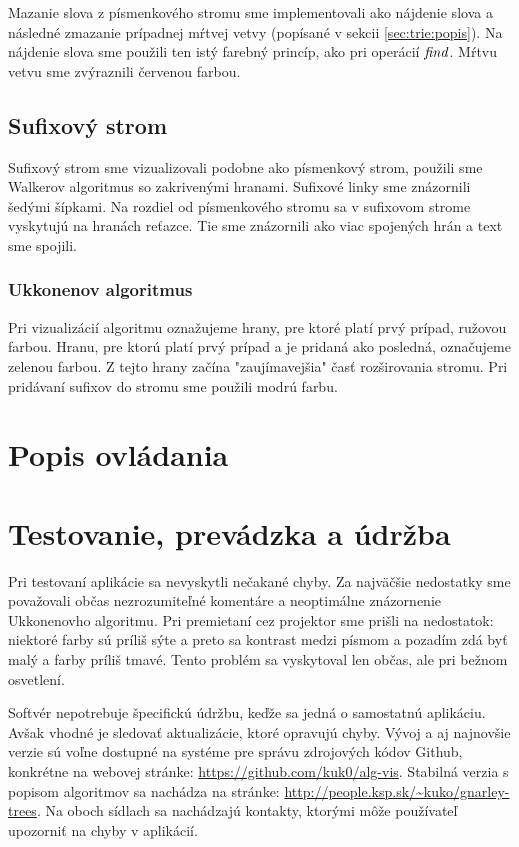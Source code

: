 Mazanie slova z písmenkového stromu sme implementovali ako nájdenie slova a 
následné zmazanie prípadnej mŕtvej vetvy (popísané v sekcii 
\ref{sec:trie:popis}). Na nájdenie slova sme použili ten istý farebný princíp, 
ako pri operácií $\mathop{\mathit{find}}$. Mŕtvu vetvu sme zvýraznili červenou farbou.

\subsection{Sufixový strom}

Sufixový strom sme vizualizovali podobne ako písmenkový strom, použili sme 
Walkerov algoritmus \citep{walker} so zakrivenými hranami. Sufixové linky 
sme znázornili šedými šípkami. Na rozdiel od písmenkového stromu sa v 
sufixovom strome vyskytujú na hranách reťazce. Tie sme znázornili ako viac 
spojených hrán a text sme spojili.

\subsubsection{Ukkonenov algoritmus}

Pri vizualizácií algoritmu oznažujeme hrany, pre ktoré platí prvý prípad, 
ružovou farbou. Hranu, pre ktorú platí prvý prípad a je pridaná ako posledná, 
označujeme zelenou farbou. Z tejto hrany začína "zaujímavejšia" časť 
rozširovania stromu. Pri pridávaní sufixov do stromu sme použili modrú farbu.

\section{Popis ovládania}\label{sec:im:im}


\section{Testovanie, prevádzka a údržba}\label{sec:im:test}

Pri testovaní aplikácie sa nevyskytli nečakané chyby. Za najväčšie nedostatky 
sme považovali občas nezrozumiteľné komentáre a neoptimálne znázornenie 
Ukkonenovho algoritmu. Pri premietaní cez projektor sme prišli na nedostatok: 
niektoré farby sú príliš sýte a preto sa kontrast medzi písmom a pozadím zdá 
byť malý a farby príliš tmavé. Tento problém sa vyskytoval len občas, ale 
pri bežnom osvetlení.

Softvér nepotrebuje špecifickú údržbu, keďže sa jedná o samostatnú aplikáciu. 
Avšak vhodné je sledovať aktualizácie, ktoré opravujú chyby. Vývoj a aj 
najnovšie verzie sú voľne dostupné na systéme pre správu zdrojových kódov 
Github, konkrétne na webovej stránke: \url{https://github.com/kuk0/alg-vis}. 
Stabilná verzia s popisom algoritmov sa nachádza na stránke: 
\url{http://people.ksp.sk/~kuko/gnarley-trees}. Na oboch sídlach sa nachádzajú 
kontakty, ktorými môže používateľ upozorniť na chyby v aplikácií.


